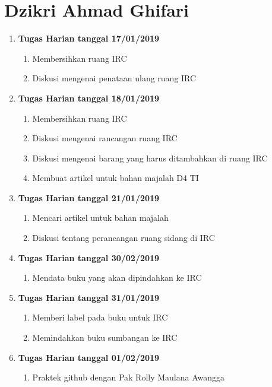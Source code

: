 \chapter{Dzikri Ahmad Ghifari}
\begin{enumerate}
\item \textbf{Tugas Harian tanggal 17/01/2019}
\begin{enumerate}
\item Membersihkan ruang IRC
\item Diskusi mengenai penataan ulang ruang IRC
\end{enumerate}

\item \textbf{Tugas Harian tanggal 18/01/2019}
\begin{enumerate}
\item Membersihkan ruang IRC
\item Diskusi mengenai rancangan ruang IRC
\item Diskusi mengenai barang yang harus ditambahkan di ruang IRC
\item Membuat artikel untuk bahan majalah D4 TI
\end{enumerate}

\item \textbf{Tugas Harian tanggal 21/01/2019}
\begin{enumerate}
\item Mencari artikel untuk bahan majalah
\item Diskusi tentang perancangan ruang sidang di IRC
\end{enumerate}

\item \textbf{Tugas Harian tanggal 30/02/2019}
\begin{enumerate}
\item Mendata buku yang akan dipindahkan ke IRC
\end{enumerate}

\item \textbf{Tugas Harian tanggal 31/01/2019}
\begin{enumerate}
\item Memberi label pada buku untuk IRC
\item Memindahkan buku sumbangan ke IRC
\end{enumerate}

\item \textbf{Tugas Harian tanggal 01/02/2019}
\begin{enumerate}
\item Praktek github dengan Pak Rolly Maulana Awangga 
\end{enumerate}


\end{enumerate}
